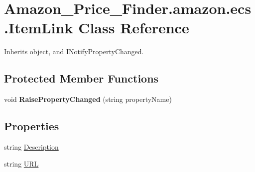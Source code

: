 \hypertarget{class_amazon___price___finder_1_1amazon_1_1ecs_1_1_item_link}{\section{Amazon\-\_\-\-Price\-\_\-\-Finder.\-amazon.\-ecs.\-Item\-Link Class Reference}
\label{class_amazon___price___finder_1_1amazon_1_1ecs_1_1_item_link}
}


 




Inherits object, and I\-Notify\-Property\-Changed.

\subsection*{Protected Member Functions}
\begin{DoxyCompactItemize}
\item 
\hypertarget{class_amazon___price___finder_1_1amazon_1_1ecs_1_1_item_link_a11f47af05c6e8c1099e71b67b18d1035}{void {\bfseries Raise\-Property\-Changed} (string property\-Name)}\label{class_amazon___price___finder_1_1amazon_1_1ecs_1_1_item_link_a11f47af05c6e8c1099e71b67b18d1035}

\end{DoxyCompactItemize}
\subsection*{Properties}
\begin{DoxyCompactItemize}
\item 
\hypertarget{class_amazon___price___finder_1_1amazon_1_1ecs_1_1_item_link_a19bca15d08193f60e50c5cb07c9eef41}{string \hyperlink{class_amazon___price___finder_1_1amazon_1_1ecs_1_1_item_link_a19bca15d08193f60e50c5cb07c9eef41}{Description}}\label{class_amazon___price___finder_1_1amazon_1_1ecs_1_1_item_link_a19bca15d08193f60e50c5cb07c9eef41}

\begin{DoxyCompactList}\small\item\em \end{DoxyCompactList}\item 
\hypertarget{class_amazon___price___finder_1_1amazon_1_1ecs_1_1_item_link_aa4cfaf73fc7fd2bf86f0ac88bd5b5333}{string \hyperlink{class_amazon___price___finder_1_1amazon_1_1ecs_1_1_item_link_aa4cfaf73fc7fd2bf86f0ac88bd5b5333}{U\-R\-L}}\label{class_amazon___price___finder_1_1amazon_1_1ecs_1_1_item_link_aa4cfaf73fc7fd2bf86f0ac88bd5b5333}

\begin{DoxyCompactList}\small\item\em \end{DoxyCompactList}\end{DoxyCompactItemize}
